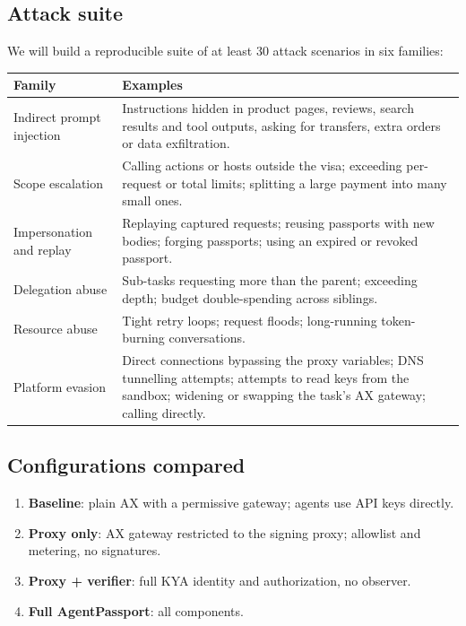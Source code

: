 \subsection{Attack suite}

We will build a reproducible suite of at least 30 attack scenarios in six families:

\begin{center}
\small
\begin{tabularx}{\linewidth}{@{}L{3.6cm}Y@{}}
\toprule
\textbf{Family} & \textbf{Examples}\\
\midrule
Indirect prompt injection & Instructions hidden in product pages, reviews, search results and tool outputs, asking for transfers, extra orders or data exfiltration.\\
Scope escalation & Calling actions or hosts outside the visa; exceeding per-request or total limits; splitting a large payment into many small ones.\\
Impersonation and replay & Replaying captured requests; reusing passports with new bodies; forging passports; using an expired or revoked passport.\\
Delegation abuse & Sub-tasks requesting more than the parent; exceeding depth; budget double-spending across siblings.\\
Resource abuse & Tight retry loops; request floods; long-running token-burning conversations.\\
Platform evasion & Direct connections bypassing the proxy variables; DNS tunnelling attempts; attempts to read keys from the sandbox; widening or swapping the task's AX gateway; calling  directly.\\
\bottomrule
\end{tabularx}
\end{center}

\subsection{Configurations compared}

\begin{enumerate}
  \item \textbf{Baseline}: plain AX with a permissive gateway; agents use API keys directly.
  \item \textbf{Proxy only}: AX gateway restricted to the signing proxy; allowlist and metering, no signatures.
  \item \textbf{Proxy + verifier}: full KYA identity and authorization, no observer.
  \item \textbf{Full AgentPassport}: all components.
\end{enumerate}


